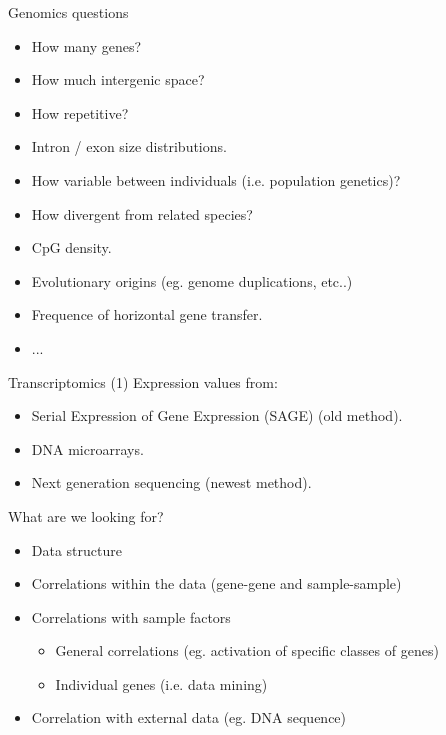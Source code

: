 \documentclass[pdf]{beamer}
\begin{document}
\begin{frame}{Genomics questions}
  \begin{itemize}
    \pause
  \item How many genes?
    \pause
  \item How much intergenic space?
    \pause
  \item How repetitive?
    \pause
  \item Intron / exon size distributions.
    \pause
  \item How variable between individuals (i.e. population genetics)?
    \pause
  \item How divergent from related species?
    \pause
  \item CpG density.
    \pause
  \item Evolutionary origins (eg. genome duplications, etc..)
    \pause
  \item Frequence of horizontal gene transfer.
    \item ...
  \end{itemize}
\end{frame}

\begin{frame}{Transcriptomics (1)}
  Expression values from:
  \begin{itemize}
    \item Serial Expression of Gene Expression (SAGE) (old method).
    \item DNA microarrays.
    \item Next generation sequencing (newest method).
  \end{itemize}
  What are we looking for?
  \begin{itemize}
    \item Data structure
    \item Correlations within the data (gene-gene and sample-sample)
    \item Correlations with sample factors
      \begin{itemize}
        \item General correlations (eg. activation of specific classes of genes)
        \item Individual genes (i.e. data mining)
      \end{itemize}
    \item Correlation with external data (eg. DNA sequence)
  \end{itemize}
\end{frame}
\end{document}
